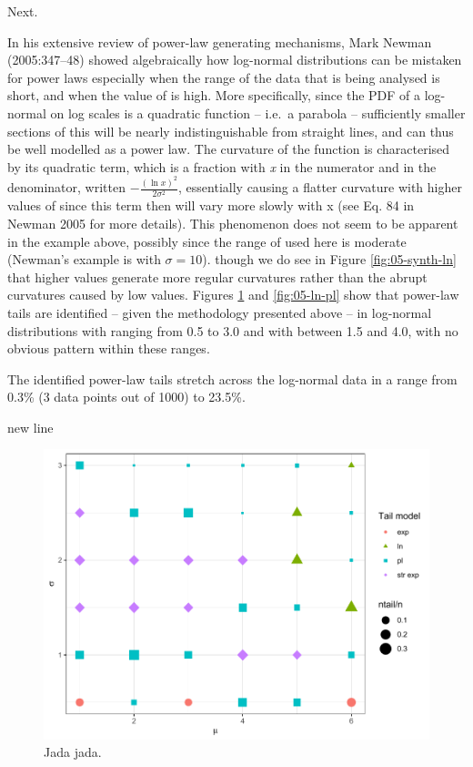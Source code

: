 \documentclass[
  12pt,
]{book}
\begin{document}
Next.

In his extensive review of power-law generating mechanisms, Mark Newman (2005:347--48) showed algebraically how log-normal distributions can be mistaken for power laws especially when the range of the data that is being analysed is short, and when the value of \sigma is high. More specifically, since the PDF of a log-normal on log scales is a quadratic function -- i.e.~a parabola -- sufficiently smaller sections of this will be nearly indistinguishable from straight lines, and can thus be well modelled as a power law. The curvature of the function is characterised by its quadratic term, which is a fraction with \emph{x} in the numerator and \sigma in the denominator, written \(-\frac{(\ln x)^2}{2\sigma^2}\), essentially causing a flatter curvature with higher values of \sigma since this term then will vary more slowly with x (see Eq. 84 in Newman 2005 for more details). This phenomenon does not seem to be apparent in the example above, possibly since the range of \sigma used here is moderate (Newman's example is with \(\sigma = 10\)). though we do see in Figure \ref{fig:05-synth-ln} that higher \sigma values generate more regular curvatures rather than the abrupt curvatures caused by low values. Figures \ref{fig:05-ln-tail} and \ref{fig:05-ln-pl} show that power-law tails are identified -- given the methodology presented above -- in log-normal distributions with \sigma ranging from 0.5 to 3.0 and with \mu between 1.5 and 4.0, with no obvious pattern within these ranges.

The identified power-law tails stretch across the log-normal data in a range from 0.3\% (3 data points out of 1000) to 23.5\%.

new line



\begin{figure}

{\centering \includegraphics[width=0.7\linewidth]{bookdown-demo_files/figure-latex/05-ln-tail-1} 

}

\caption{Jada jada.}\label{fig:05-ln-tail}
\end{figure}
\end{document}
